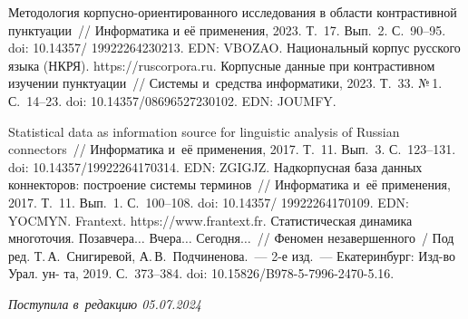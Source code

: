 \begin{multicols}{2}
{{\begin{thebibliography}{99}
 Методология кор\-пус\-но-ори\-ен\-ти\-ро\-ван\-но\-го 
исследования в области конт\-рас\-тив\-ной пунктуации~// Информатика и её 
применения, 2023. Т.~17. Вып.~2. С.~90--95. doi: 10.14357/ 19922264230213. 
EDN: VBOZAO.
Национальный корпус русского языка (НКРЯ). {\sf https://ruscorpora.ru}.
 Корпусные данные при контрастивном 
изучении пунктуации~// Системы и~средства информатики, 2023. Т.~33. №\,1. 
С.~14--23. doi: 10.14357/08696527230102.  EDN: JOUMFY.

 Statistical data as information source for linguistic 
analysis of Russian connectors~// Информатика и~её применения, 2017. Т.~11. 
Вып.~3. С.~123--131. doi: 10.14357/19922264170314. EDN: ZGIGJZ.
 Надкорпусная база 
данных коннекторов: по\-стро\-ение сис\-те\-мы терминов~// Информатика и~её 
применения, 2017. Т.~11. Вып.~1. С.~100--108. doi: 
10.14357/ 19922264170109. EDN: YOCMYN.
Frantext. {\sf https://www.frantext.fr}.
 Статистическая динамика многоточия. Позавчера$\ldots$ 
Вчера$\ldots$ Сегодня$\ldots$~// Феномен незавершенного~/ Под ред. 
Т.\,А.~Снигиревой, А.\,В.~Подчиненова.~--- 2-е изд.~--- Екатеринбург: Изд-во Урал. ун-
та, 2019. С.~373--384. doi: 10.15826/B978-5-7996-2470-5.16.
    
  
    
\end{thebibliography}
} }

\end{multicols}

 \label{end\stat}

 \vspace*{-9pt}

\hfill{\small\textit{Поступила в~редакцию 05.07.2024}}


\renewcommand{\figurename}{\protect\bf Рис.}
\renewcommand{\tablename}{\protect\bf Таблица}